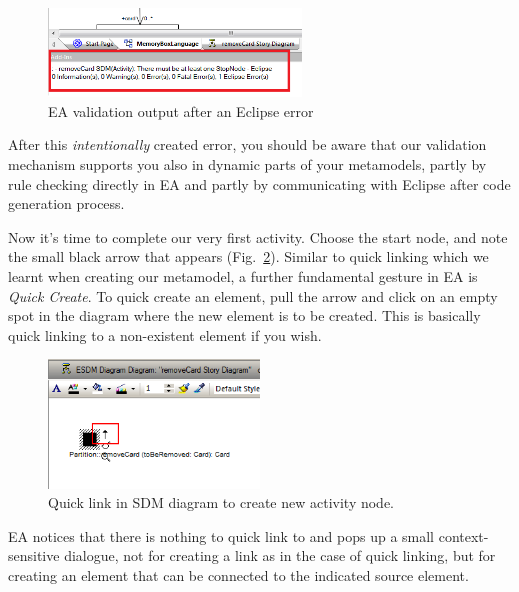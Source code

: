 \clearpage

\begin{figure}[htp]
\begin{center}
  \includegraphics[width=0.6\textwidth]{pics/sdmBilder/removeCard/sdm16RAW}
  \caption{EA validation output after an Eclipse error}  
  \label{fig:ea_eclipse_error}
\end{center}
\end{figure}

After this \emph{intentionally} created error, you should be aware that our
validation mechanism supports you also in dynamic parts of your metamodels,
partly by rule checking directly in EA and partly by communicating with Eclipse
after code generation process.
 
Now it's time to complete our very first activity. Choose the start node, and
note the small black arrow that appears (Fig.~\ref{fig:sdm_quicklink}).  Similar to quick linking which we learnt when
creating our metamodel, a further fundamental gesture in EA is \emph{Quick
Create}. To quick create an element, pull the arrow and click on an empty spot
in the diagram where the new element is to be created.  This is basically quick
linking to a non-existent element if you wish.

\begin{figure}[htp]
\begin{center}
  \includegraphics[width=0.5\textwidth]{pics/sdmBilder/removeCard/sdm03RAW}
  \caption{Quick link in SDM diagram to create new activity node.}  
  \label{fig:sdm_quicklink}
\end{center}
\end{figure}

EA notices that there is nothing to quick link to and pops up a small
context-sensitive dialogue, not for creating a link as in the case of quick
linking, but for creating an element that can be connected to the
indicated source element. 


